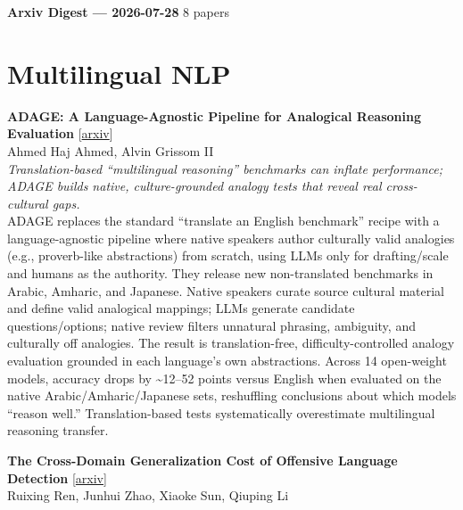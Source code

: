 \documentclass[12pt,letterpaper]{article}
\begin{document}
{\footnotesize\textbf{Arxiv Digest --- 2026-07-28} \hfill 8 papers}

\smallskip

\section*{Multilingual NLP}

{\small\textbf{ADAGE: A Language-Agnostic Pipeline for Analogical Reasoning Evaluation}} {\scriptsize[\href{https://arxiv.org/abs/2607.23058}{arxiv}]}\\
{\scriptsize Ahmed Haj Ahmed, Alvin Grissom II}\\

{\small\textit{Translation-based ``multilingual reasoning'' benchmarks can inflate performance; ADAGE builds native, culture-grounded analogy tests that reveal real cross-cultural gaps.}}\\[1pt]
{\footnotesize ADAGE replaces the standard ``translate an English benchmark'' recipe with a language-agnostic pipeline where native speakers author culturally valid analogies (e.g., proverb-like abstractions) from scratch, using LLMs only for drafting/scale and humans as the authority. They release new non-translated benchmarks in Arabic, Amharic, and Japanese. Native speakers curate source cultural material and define valid analogical mappings; LLMs generate candidate questions/options; native review filters unnatural phrasing, ambiguity, and culturally off analogies. The result is translation-free, difficulty-controlled analogy evaluation grounded in each language's own abstractions. Across 14 open-weight models, accuracy drops by \textasciitilde{}12--52 points versus English when evaluated on the native Arabic/Amharic/Japanese sets, reshuffling conclusions about which models ``reason well.'' Translation-based tests systematically overestimate multilingual reasoning transfer.}

\medskip

{\small\textbf{The Cross-Domain Generalization Cost of Offensive Language Detection}} {\scriptsize[\href{https://arxiv.org/abs/2607.23512}{arxiv}]}\\
{\scriptsize Ruixing Ren, Junhui Zhao, Xiaoke Sun, Qiuping Li}\\
\end{document}
